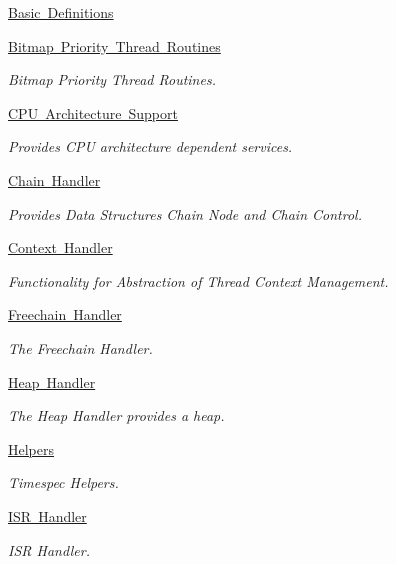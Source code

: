 \begin{DoxyCompactItemize}
\mbox{\hyperlink{group__RTEMSScoreBaseDefs}{Basic Definitions}}
\item 
\mbox{\hyperlink{group__RTEMSScorePriorityBitmap}{Bitmap Priority Thread Routines}}
\begin{DoxyCompactList}\small\item\em Bitmap Priority Thread Routines. \end{DoxyCompactList}\item 
\mbox{\hyperlink{group__RTEMSScoreCPU}{C\+P\+U Architecture Support}}
\begin{DoxyCompactList}\small\item\em Provides C\+PU architecture dependent services. \end{DoxyCompactList}\item 
\mbox{\hyperlink{group__RTEMSScoreChain}{Chain Handler}}
\begin{DoxyCompactList}\small\item\em Provides Data Structures Chain Node and Chain Control. \end{DoxyCompactList}\item 
\mbox{\hyperlink{group__RTEMSScoreContext}{Context Handler}}
\begin{DoxyCompactList}\small\item\em Functionality for Abstraction of Thread Context Management. \end{DoxyCompactList}\item 
\mbox{\hyperlink{group__RTEMSScoreFreechain}{Freechain Handler}}
\begin{DoxyCompactList}\small\item\em The Freechain Handler. \end{DoxyCompactList}\item 
\mbox{\hyperlink{group__RTEMSScoreHeap}{Heap Handler}}
\begin{DoxyCompactList}\small\item\em The Heap Handler provides a heap. \end{DoxyCompactList}\item 
\mbox{\hyperlink{group__Timespec}{Helpers}}
\begin{DoxyCompactList}\small\item\em Timespec Helpers. \end{DoxyCompactList}\item 
\mbox{\hyperlink{group__RTEMSScoreISR}{I\+S\+R Handler}}
\begin{DoxyCompactList}\small\item\em I\+SR Handler. \end{DoxyCompactList}\item 

\end{DoxyCompactItemize}

